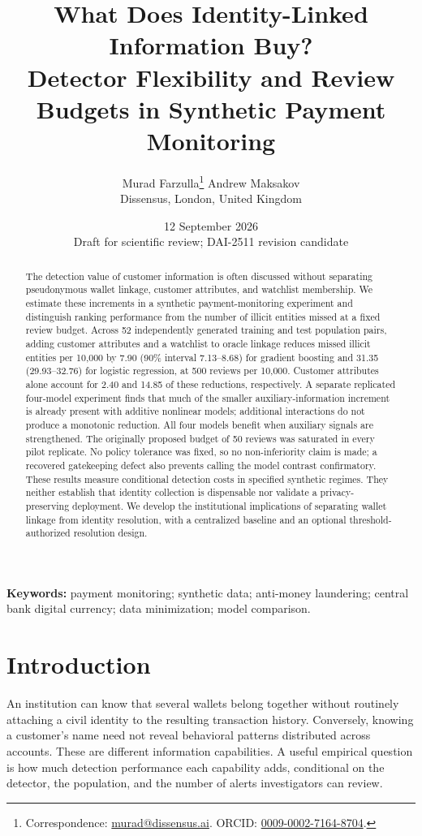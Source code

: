 \documentclass[11pt,a4paper]{article}
\title{\color{burgundy}\bfseries What Does Identity-Linked Information Buy?\\[5pt]\large Detector Flexibility and Review Budgets in Synthetic Payment Monitoring}
\author{Murad Farzulla\thanks{Correspondence: \href{mailto:murad@dissensus.ai}{murad@dissensus.ai}. ORCID: \href{https://orcid.org/0009-0002-7164-8704}{0009-0002-7164-8704}.} \quad Andrew Maksakov\\[3pt]\small Dissensus, London, United Kingdom}
\date{12 September 2026\\\small Draft for scientific review; DAI-2511 revision candidate}
\begin{document}
\maketitle
\begin{abstract}
The detection value of customer information is often discussed without separating pseudonymous wallet linkage, customer attributes, and watchlist membership. We estimate these increments in a synthetic payment-monitoring experiment and distinguish ranking performance from the number of illicit entities missed at a fixed review budget. Across 52 independently generated training and test population pairs, adding customer attributes and a watchlist to oracle linkage reduces missed illicit entities per 10,000 by 7.90 (90\% interval 7.13--8.68) for gradient boosting and 31.35 (29.93--32.76) for logistic regression, at 500 reviews per 10,000. Customer attributes alone account for 2.40 and 14.85 of these reductions, respectively. A separate replicated four-model experiment finds that much of the smaller auxiliary-information increment is already present with additive nonlinear models; additional interactions do not produce a monotonic reduction. All four models benefit when auxiliary signals are strengthened. The originally proposed budget of 50 reviews was saturated in every pilot replicate. No policy tolerance was fixed, so no non-inferiority claim is made; a recovered gatekeeping defect also prevents calling the model contrast confirmatory. These results measure conditional detection costs in specified synthetic regimes. They neither establish that identity collection is dispensable nor validate a privacy-preserving deployment. We develop the institutional implications of separating wallet linkage from identity resolution, with a centralized baseline and an optional threshold-authorized resolution design.
\end{abstract}
\noindent\textbf{Keywords:} payment monitoring; synthetic data; anti-money laundering; central bank digital currency; data minimization; model comparison.

\section{Introduction}
An institution can know that several wallets belong together without routinely attaching a civil identity to the resulting transaction history. Conversely, knowing a customer's name need not reveal behavioral patterns distributed across accounts. These are different information capabilities. A useful empirical question is how much detection performance each capability adds, conditional on the detector, the population, and the number of alerts investigators can review.
\end{document}
